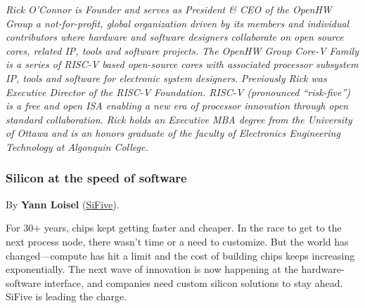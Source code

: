 \documentclass[a4paper, 10pt]{article}
\begin{document}
{\emph{\footnotesize Rick O'Connor is Founder and serves as President \& CEO of the OpenHW Group a not-for-profit, global organization driven by its members and individual contributors where hardware and software designers collaborate on open source cores, related IP, tools and software projects. The OpenHW Group Core-V Family is a series of RISC-V based open-source cores with associated processor subsystem IP, tools and software for electronic system designers.}
\emph{\footnotesize Previously Rick was Executive Director of the RISC-V Foundation. RISC-V (pronounced “risk-five”) is a free and open ISA enabling a new era of processor innovation through open standard collaboration.}
\emph{\footnotesize Rick holds an Executive MBA degree from the University of Ottawa and is an honors graduate of the faculty of Electronics Engineering Technology at Algonquin College.}

\subsubsection{Silicon at the speed of software}
\label{sec:org4fde642}
By \textbf{Yann Loisel} (\href{https://sifive.com}{SiFive}).

For 30+ years, chips kept getting faster and cheaper. In the race to
get to the next process node, there wasn't time or a need to
customize. But the world has changed—compute has hit a limit and the
cost of building chips keeps increasing exponentially.
The next wave of innovation is now happening at the hardware-software
interface, and companies need custom silicon solutions to stay
ahead. SiFive is leading the charge.

}
\end{document}
